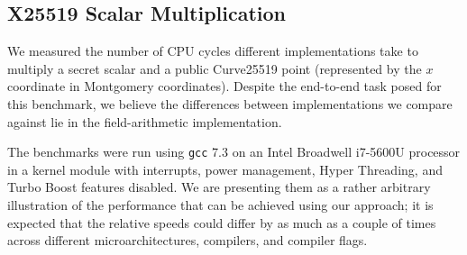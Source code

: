 \documentclass[letterpaper,twocolumn,10pt]{article}
\begin{document}
\subsection{X25519 Scalar Multiplication}

We measured the number of CPU cycles different implementations take to multiply a secret scalar and a public Curve25519 point (represented by the $x$ coordinate in Montgomery coordinates).
Despite the end-to-end task posed for this benchmark, we believe the differences between implementations we compare against lie in the field-arithmetic implementation.

The benchmarks were run using \texttt{gcc} 7.3 on an Intel Broadwell i7-5600U processor in a kernel module
with interrupts, power management, Hyper Threading, and Turbo Boost features disabled.
We are presenting them as a rather arbitrary illustration of the performance that can be achieved using our approach; it is expected that the relative speeds could differ by as much as a couple of times across different microarchitectures, compilers, and compiler flags.
\end{document}
